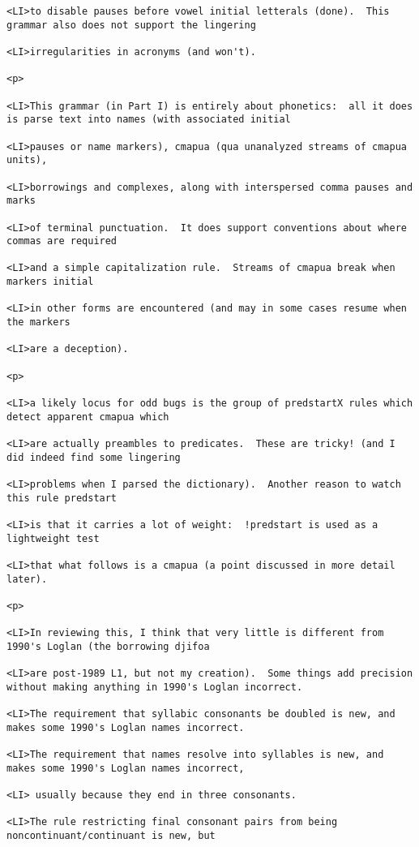 \documentclass[12pt]{article}
\begin{document}
\begin{lstlisting}
<LI>to disable pauses before vowel initial letterals (done).  This grammar also does not support the lingering

<LI>irregularities in acronyms (and won't).

<p>

<LI>This grammar (in Part I) is entirely about phonetics:  all it does is parse text into names (with associated initial

<LI>pauses or name markers), cmapua (qua unanalyzed streams of cmapua units),

<LI>borrowings and complexes, along with interspersed comma pauses and marks

<LI>of terminal punctuation.  It does support conventions about where commas are required

<LI>and a simple capitalization rule.  Streams of cmapua break when markers initial

<LI>in other forms are encountered (and may in some cases resume when the markers

<LI>are a deception).

<p>

<LI>a likely locus for odd bugs is the group of predstartX rules which detect apparent cmapua which

<LI>are actually preambles to predicates.  These are tricky! (and I did indeed find some lingering

<LI>problems when I parsed the dictionary).  Another reason to watch this rule predstart

<LI>is that it carries a lot of weight:  !predstart is used as a lightweight test

<LI>that what follows is a cmapua (a point discussed in more detail later).

<p>

<LI>In reviewing this, I think that very little is different from 1990's Loglan (the borrowing djifoa

<LI>are post-1989 L1, but not my creation).  Some things add precision without making anything in 1990's Loglan incorrect.

<LI>The requirement that syllabic consonants be doubled is new, and makes some 1990's Loglan names incorrect.

<LI>The requirement that names resolve into syllables is new, and makes some 1990's Loglan names incorrect,

<LI> usually because they end in three consonants.

<LI>The rule restricting final consonant pairs from being noncontinuant/continuant is new, but


\end{lstlisting}
\end{document}
